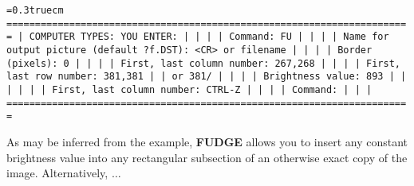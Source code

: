 \bigskip
{\noindent\obeylines\obeyspaces\frenchspacing\tt\baselineskip=0.3truecm
=======================================================================
| COMPUTER TYPES:                                  YOU ENTER:         |
|                                                                     |
| Command:                                         FU                 |
|                                                                     |
|  Name for output picture (default ?f.DST):       <CR> or filename   |
|                                                                     |
|                           Border (pixels):       0                  |
|                                                                     |
|                 First, last column number:       267,268            |
|                                                                     |
|                    First, last row number:       381,381            |
|                                              or  381/               |
|                                                                     |
|                          Brightness value:       893                |
|                                                                     |
|                                                                     |
|                 First, last column number:       CTRL-Z             |
|                                                                     |
| Command:                                                            |
|                                                                     |
=======================================================================
}
\bigskip

As may be inferred from the example, {\bf FUDGE} allows you to insert
any constant brightness value into any rectangular subsection of an
otherwise exact copy of the image.  Alternatively, $\ldots$

